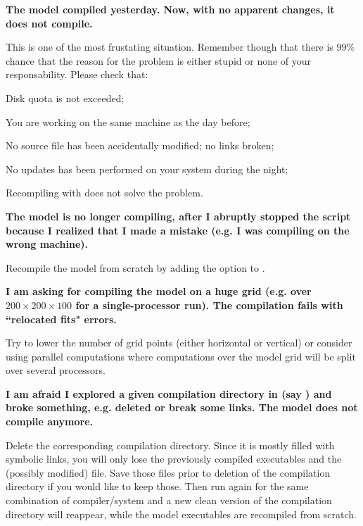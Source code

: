 \sk
\noindent \textbf{The model compiled yesterday. Now, with no apparent changes, it does not compile.}
\begin{finger}
\item This is one of the most frustating situation. Remember though that there is $99\%$ chance that the reason for the problem is either stupid or none of your responsability. Please check that:
\begin{citemize}
\item Disk quota is not exceeded;
\item You are working on the same machine as the day before;
\item No source file has been accidentally modified; no links broken;
\item No updates has been performed on your system during the night;
\item Recompiling with  does not solve the problem.
\end{citemize}
\end{finger}

\sk
\noindent \textbf{The model is no longer compiling, after I abruptly stopped the  script because I realized that I made a mistake (e.g. I was compiling on the wrong machine).}
\begin{finger}
\item Recompile the model from scratch by adding the option  to .
\end{finger}

\sk
\noindent \textbf{I am asking for compiling the model on a huge grid (e.g. over $200 \times 200 \times 100$ for a single-processor run). The compilation fails with ``relocated fits" errors.}
\begin{finger}
\item Try to lower the number of grid points (either horizontal or vertical) or consider using parallel computations where computations over the model grid will be split over several processors.
\end{finger}

\sk
\noindent \textbf{I am afraid I explored a given compilation directory in  (say ) and broke something, e.g. deleted or break some links. The model does not compile anymore.}
\begin{finger}
\item Delete the corresponding compilation directory. Since it is mostly filled with symbolic links, you will only lose the previously compiled executables and the (possibly modified)  file. Save those files prior to deletion of the compilation directory if you would like to keep those. Then run again  for the same combination of compiler/system and a new clean version of the compilation directory will reappear, while the model executables are recompiled from scratch.
\end{finger}


